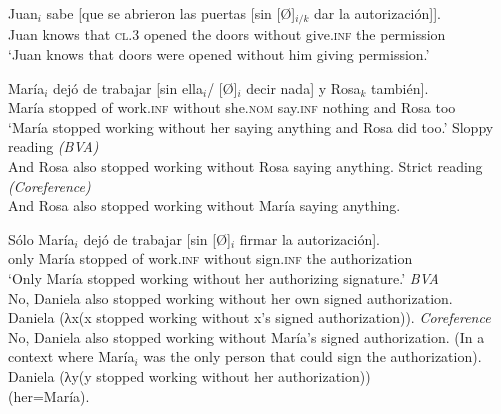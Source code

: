 \documentclass[output=paper,colorlinks,citecolor=brown,draft,draftmode]{langscibook}
\begin{document}
\begin{exe}
\ex\label{07:sp17}
\gll Juan$_i$ sabe [que se abrieron las puertas [sin [Ø]$_{i/k}$ dar la autorización]]. \\
Juan knows that \textsc{cl.3} opened the doors without {} give.\textsc{inf} the permission \\
\glt ‘Juan knows that doors were opened without him giving permission.’
\end{exe}


\begin{exe}
\ex \label{07:sp18}
\gll María$_i$   dejó de trabajar    [sin ella$_i$/ [Ø]$_i$  decir nada] y Rosa$_k$ también]. \\
María stopped of work.\textsc{inf} without she.\textsc{nom} {} say.\textsc{inf} nothing and Rosa too\\
\glt ‘María stopped working without her saying anything and Rosa did too.’
\ea\cmark Sloppy reading \textit{(BVA)}\\
And Rosa also stopped working without Rosa saying anything.
\ex\cmark Strict reading \textit{(Coreference)}\\
And Rosa also stopped working without María saying anything.
 \z
\end{exe}

\begin{exe}
\ex \label{07:sp19}
\gll Sólo María$_i$ dejó de trabajar [sin [Ø]$_i$ firmar la autorización].\\
only María stopped of work.\textsc{inf} without {} sign.\textsc{inf} the authorization\\
\glt ‘Only María stopped working without her authorizing signature.’
\ea \cmark\textit{BVA}\\
No, Daniela also stopped working without her own signed authorization.\\
Daniela (λx(x stopped working without x’s signed authorization)).
\ex \cmark\textit{Coreference}\\
No, Daniela also stopped working without María’s signed authorization. (In a context where María$_i$ was the only person that could sign the authorization).\\
Daniela (λy(y stopped working without her authorization))\\ (her=María).
 \z
\end{exe}
\end{document}
